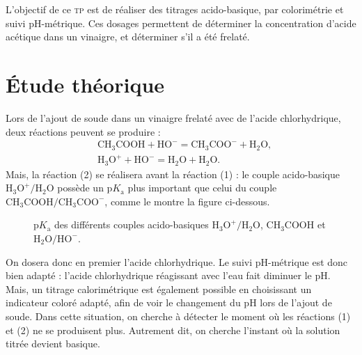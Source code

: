 \documentclass[a4paper,twocolumn,10pt,margin=0.5in]{extreport}
\begin{document}
	L'objectif de ce \textsc{tp} est de réaliser des titrages acido-basique, par colorimétrie et suivi $\mathrm{pH}$-métrique. Ces dosages permettent de déterminer la concentration d'acide acétique dans un vinaigre, et déterminer s'il a été frelaté.

	\section{Étude théorique}

	Lors de l'ajout de soude dans un vinaigre frelaté avec de l'acide chlorhydrique, deux réactions peuvent se produire :
	\begin{align}
		&\mathrm{CH_3COOH + HO^- = CH_3COO^- + H_2O},\\
		&\mathrm{H_3O^+ + HO^- = H_2O + H_2O}.
	\end{align}
	Mais, la réaction (2) se réalisera avant la réaction (1) : le couple acido-basique $\mathrm{H_3O^+/H_2O}$\/ possède un $\mathrm{p}K_\mathrm{a}$\/ plus important que celui du couple $\mathrm{CH_3COOH/CH_3COO^-}$, comme le montre la figure ci-dessous.
	\begin{figure}[H]
		\centering
		\caption{$\mathrm{p}K_\mathrm{a}$\/ des différents couples acido-basiques $\mathrm{H_3O^+ / H_2O}$, $\mathrm{CH_3 COOH}$\/ et $\mathrm{H_2O / HO^-}$.}
	\end{figure}
	\noindent On dosera donc en premier l'acide chlorhydrique.
	Le suivi $\mathrm{pH}$-métrique est donc bien adapté : l'acide chlorhydrique réagissant avec l'eau fait diminuer le $\mathrm{pH}$.
	Mais, un titrage calorimétrique est également possible en choisissant un indicateur coloré adapté, afin de voir le changement du $\mathrm{pH}$ lors de l'ajout de soude.
	Dans cette situation, on cherche à détecter le moment où les réactions (1) et (2) ne se produisent plus. Autrement dit, on cherche l'instant où la solution titrée devient basique.
\end{document}
